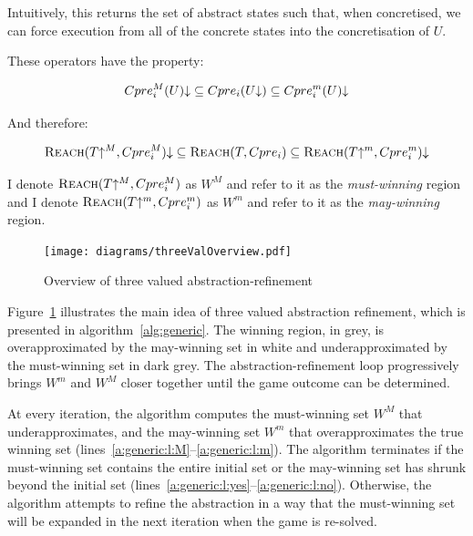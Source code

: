 Intuitively, this returns the set of abstract states such that, when concretised, we can force execution from all of the concrete states into the concretisation of $U$.

These operators have the property:

\begin{equation}
Cpre_i^M(U)\mathord{\downarrow} \subseteq Cpre_i(U\mathord{\downarrow}) \subseteq Cpre_i^m(U)\mathord{\downarrow}
\end{equation}

And therefore:

\begin{equation}
\label{eqn:cpre_inclusion}
\textsc{Reach}(T\mathord{\uparrow^M}, Cpre_i^M)\mathord{\downarrow} \subseteq \textsc{Reach}(T, Cpre_i) \subseteq \textsc{Reach}(T\mathord{\uparrow^m}, Cpre_i^m)\mathord{\downarrow}
\end{equation}

I denote $\textsc{Reach}(T\mathord{\uparrow^M}, Cpre_i^M)$ as $W^M$ and refer to it as the \emph{must-winning} region and I denote $\textsc{Reach}(T\mathord{\uparrow^m}, Cpre_i^m)$ as $W^m$ and refer to it as the \emph{may-winning} region.

\begin{figure}[t]
\centering
\texttt{[image: diagrams/threeValOverview.pdf]}
\caption{Overview of three valued abstraction-refinement}
\label{fig:three_val_overview}
\end{figure}

Figure~\ref{fig:three_val_overview} illustrates the main idea of three valued abstraction refinement, which is presented in algorithm~\ref{alg:generic}. The winning region, in grey, is overapproximated by the may-winning set in white and underapproximated by the must-winning set in dark grey. The abstraction-refinement loop progressively brings $W^m$ and $W^M$ closer together until the game outcome can be determined.

At every iteration, the algorithm computes the must-winning set $W^M$ that underapproximates, and the may-winning set $W^m$ that overapproximates the true winning set (lines~\ref{a:generic:l:M}--\ref{a:generic:l:m}). The algorithm terminates if the must-winning set contains the entire initial set or the may-winning set has shrunk beyond the initial set (lines~\ref{a:generic:l:yes}--\ref{a:generic:l:no}).  Otherwise, the algorithm attempts to refine the abstraction in a way that the must-winning set will be expanded in the next iteration when the game is re-solved.

